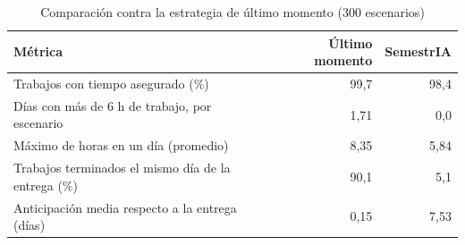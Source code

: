 \begin{table}[H]
\centering\small
\caption{Comparación contra la estrategia de último momento (300 escenarios)}\label{tab:comparacion}
\begin{tabular}{lrr}
\toprule
Métrica & Último momento & SemestrIA \\
\midrule
Trabajos con tiempo asegurado (\%) & 99,7 & 98,4 \\
Días con más de 6 h de trabajo, por escenario & 1,71 & 0,0 \\
Máximo de horas en un día (promedio) & 8,35 & 5,84 \\
Trabajos terminados el mismo día de la entrega (\%) & 90,1 & 5,1 \\
Anticipación media respecto a la entrega (días) & 0,15 & 7,53 \\
\bottomrule
\end{tabular}
\end{table}
